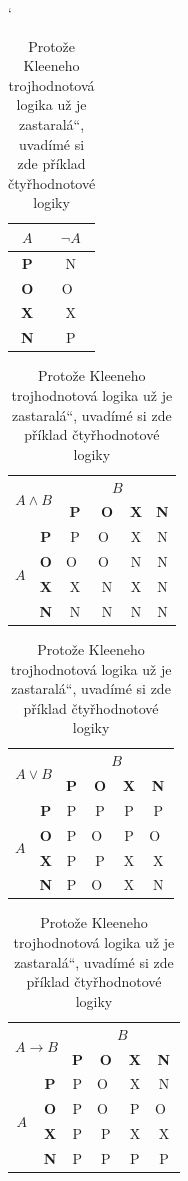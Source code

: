 \documentclass[11pt,a4paper]{article}
\newcommand{\myuv}[1]{\quotedblbase #1\textquotedblleft}
\begin{document}
\begin{table}[h]
\begin{center}
\catcode` 
	\begin{tabular}{|c|c|} \hline
		$A$ & $\neg A$\\ \hline
		\textbf{P} & N \\ \hline
		\textbf{O} & O~\\ \hline
		\textbf{X} & X \\ \hline
		\textbf{N} & P \\ \hline
	\end{tabular}
	\begin{tabular}{|c|c|c|c|c|c|} \hline
	\multicolumn{2}{|c|}{\multirow{2}{*}{$A \wedge B$}} & \multicolumn{4}{c|}{$B$}\\ \cline{3-6} 
	\multicolumn{2}{|c|}{} & \textbf{P} & \textbf{O} & \textbf{X} & \textbf{N} \\ \hline	
	\multirow{4}{*}{$A$} & \textbf{P} & P & O~& X & N	\\ \cline{2-6}
	& \textbf{O} & O~& O~& N & N \\ \cline{2-6}
	& \textbf{X} & X & N & X & N \\ \cline{2-6}
	& \textbf{N} & N & N & N & N \\ \hline
	\end{tabular}
		\begin{tabular}{|c|c|c|c|c|c|} \hline
	\multicolumn{2}{|c|}{\multirow{2}{*}{$A \vee B$}} & \multicolumn{4}{c|}{$B$}\\ \cline{3-6}
	\multicolumn{2}{|c|}{} & \textbf{P} & \textbf{O} & \textbf{X} & \textbf{N} \\ \hline
	\multirow{4}{*}{$A$} & \textbf{P} & P & P & P & P	\\ \cline{2-6}
	& \textbf{O} & P & O~& P & O~\\ \cline{2-6}
	& \textbf{X} & P & P & X & X \\ \cline{2-6}
	& \textbf{N} & P & O~& X & N \\ \hline
	\end{tabular}
		\begin{tabular}{|c|c|c|c|c|c|} \hline
	\multicolumn{2}{|c|}{\multirow{2}{*}{$A \rightarrow B$}} & \multicolumn{4}{c|}{$B$}\\ \cline{3-6}
	\multicolumn{2}{|c|}{} & \textbf{P} & \textbf{O} & \textbf{X} & \textbf{N} \\ \hline
	\multirow{4}{*}{$A$} & \textbf{P} & P & O~& X & N	\\ \cline{2-6}
	& \textbf{O} & P & O~& P & O~\\ \cline{2-6}
	& \textbf{X} & P & P & X & X \\ \cline{2-6}
	& \textbf{N} & P & P & P & P \\ \hline
	\end{tabular}
\caption{Protože Kleeneho trojhodnotová logika už je \myuv{zastaralá}, uvadímé si zde příklad čtyřhodnotové logiky}
\label{tab:Kleene}
\end{center}
\end{table}
\newpage
\end{document}
